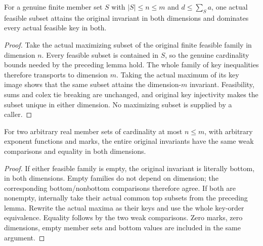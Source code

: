 \begin{lemma}
\label{hir:submersion-monomial-common-top}
For a genuine finite member set $S$ with $|S|\le n\le m$ and
$d\le\sum_Sa$, one actual feasible subset attains the original invariant
in both dimensions and dominates every actual feasible key in both.
\leanok
\end{lemma}
\begin{proof}
Take the actual maximizing subset of the original finite feasible family
in dimension $n$. Every feasible subset is contained in $S$, so the
genuine cardinality bounds needed by the preceding lemma hold. The whole
family of key inequalities therefore transports to dimension $m$.
Taking the actual maximum of its key image shows that the same subset
attains the dimension-$m$ invariant. Feasibility, sums and colex tie
breaking are unchanged, and original key injectivity makes the subset
unique in either dimension. No maximizing subset is supplied by a caller.
\end{proof}

\begin{lemma}
\label{hir:submersion-monomial-invariant-order}
For two arbitrary real member sets of cardinality at most $n\le m$, with
arbitrary exponent functions and marks, the entire original invariants
have the same weak comparisons and equality in both dimensions.
\leanok
\end{lemma}
\begin{proof}
If either feasible family is empty, the original invariant is literally
bottom, in both dimensions. Empty families do not depend on dimension;
the corresponding bottom/nonbottom comparisons therefore agree. If both
are nonempty, internally take their actual common top subsets from the
preceding lemma. Rewrite the actual maxima as their keys and use the
whole key-order equivalence. Equality follows by the two weak comparisons.
Zero marks, zero dimensions, empty member sets and bottom values are
included in the same argument.
\end{proof}

